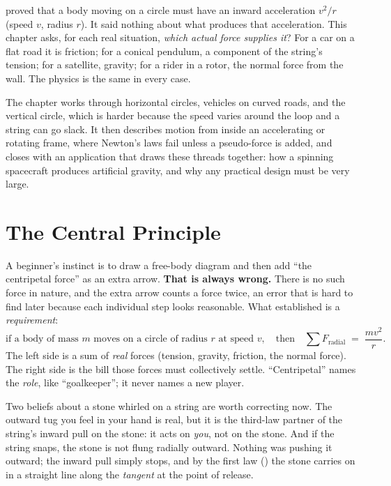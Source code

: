 \label{ch:circdyn}

 proved that a body moving on a circle must have an inward acceleration $v^2/r$ (speed $v$, radius $r$). It said nothing
about what produces that acceleration. This chapter asks, for each real situation, \emph{which actual
force supplies it}? For a car on a flat road it is friction; for a conical pendulum, a component of the
string's tension; for a satellite, gravity; for a rider in a rotor, the normal force from the wall. The
physics is the same in every case.

The chapter works through horizontal circles, vehicles on curved roads, and the vertical circle, which is
harder because the speed varies around the loop and a string can go slack. It then describes motion from
inside an accelerating or rotating frame, where Newton's laws fail unless a pseudo-force is added, and
closes with an application that draws these threads together: how a spinning spacecraft produces
artificial gravity, and why any practical design must be very large.

\section{The Central Principle}\label{sec:centralprinciple}

A beginner's instinct is to draw a free-body diagram and then add ``the centripetal force'' as an extra
arrow. \textbf{That is always wrong.} There is no such force in nature, and the extra arrow counts a
force twice, an error that is hard to find later because each individual step looks reasonable. What
 established is a \emph{requirement}:
\[
\text{if a body of mass } m \text{ moves on a circle of radius } r \text{ at speed } v,
\quad\text{then}\quad
\sum F_{\text{radial}} \;=\; \frac{mv^{2}}{r}.
\]
The left side is a sum of \emph{real} forces (tension, gravity, friction, the normal force). The right
side is the bill those forces must collectively settle. ``Centripetal'' names the \emph{role}, like
``goalkeeper''; it never names a new player.

Two beliefs about a stone whirled on a string are worth correcting now. The outward tug you feel in your
hand is real, but it is the third-law partner of the string's inward pull on the stone: it acts on
\emph{you}, not on the stone. And if the string snaps, the stone is not flung radially outward. Nothing
was pushing it outward; the inward pull simply stops, and by the first law () the stone
carries on in a straight line along the \emph{tangent} at the point of release.

